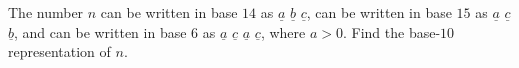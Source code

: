 The number \(n\) can be written in base \(14\) as \(\underline{a}\) \(\underline{b}\) \(\underline{c}\),  can be written in base \(15\) as \(\underline{a}\) \(\underline{c}\) \(\underline{b}\),  and can be written in base \(6\) as \(\underline{a}\) \(\underline{c}\) \(\underline{a}\) \(\underline{c}\),  where \(a > 0\). Find the base-\(10\) representation of \(n\).